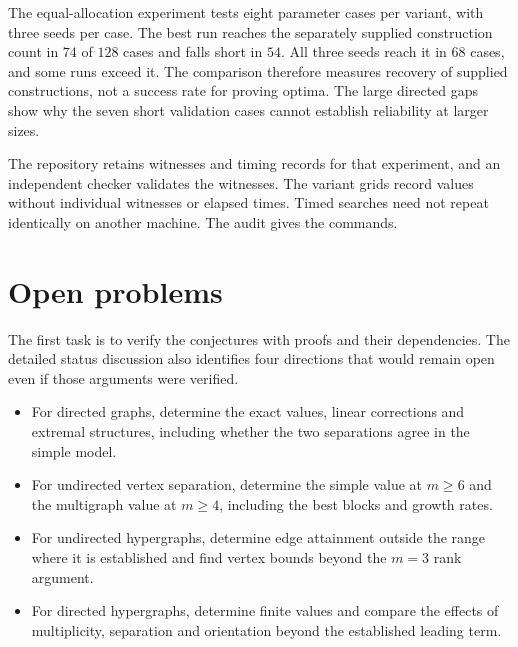 The equal-allocation experiment tests eight parameter cases per variant,
with three seeds per case. The best run reaches the separately supplied
construction count in $74$ of $128$ cases and falls short in $54$.
All three seeds reach it in $68$ cases, and some runs exceed it. The
comparison therefore measures recovery of supplied constructions, not a
success rate for proving optima. The large directed gaps show why the seven
short validation cases cannot establish reliability at larger sizes.

The repository retains witnesses and timing records for that experiment,
and an independent checker validates the witnesses. The variant grids record
values without individual witnesses or elapsed times. Timed searches need not
repeat identically on another machine. The audit gives the commands.

\section{Open problems}

The first task is to verify the conjectures with proofs and their dependencies.
The detailed status discussion also identifies four directions that would
remain open even if those arguments were verified.
\begin{itemize}
\item For directed graphs, determine the exact values, linear corrections and
extremal structures, including whether the two separations agree in the simple model.
\item For undirected vertex separation, determine the simple value at $m\ge6$
and the multigraph value at $m\ge4$, including the best blocks and growth rates.
\item For undirected hypergraphs, determine edge attainment outside the range
where it is established and find vertex bounds beyond the $m=3$ rank argument.
\item For directed hypergraphs, determine finite values and compare the effects
of multiplicity, separation and orientation beyond the established leading term.
\end{itemize}
